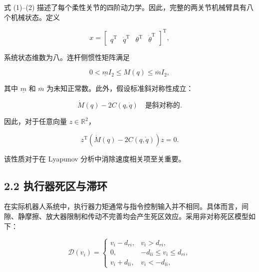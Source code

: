 \documentclass{article}
\begin{document}
式 (1)–(2) 描述了每个柔性关节的四阶动力学。因此，完整的两关节机械臂具有八个机械状态。定义

\begin{equation*}
x=\begin{bmatrix}q^{\mathrm T} & \dot q^{\mathrm T} & \theta^{\mathrm T} & \dot\theta^{\mathrm T}\end{bmatrix}^{\mathrm T},
\end{equation*}

系统状态维数为八。连杆侧惯性矩阵满足

\begin{equation}
0<\underline m I_2\leq M(q)\leq \overline m I_2, \tag{4}
\end{equation}

其中 $\underline m$ 和 $\overline m$ 为未知正常数。此外，假设标准斜对称性成立：

\begin{equation}
\dot M(q)-2C(q,\dot q) \quad \text{是斜对称的}. \tag{5}
\end{equation}

因此，对于任意向量 $z\in\mathbb{R}^{2}$，

\begin{equation*}
z^{\mathrm T}\left(\dot M(q)-2C(q,\dot q)\right)z=0.
\end{equation*}

该性质对于在 Lyapunov 分析中消除速度相关项至关重要。

\begin{figure}[h]
\centering
{}
\end{figure}

\subsection{2.2 执行器死区与滞环}

在实际机器人系统中，执行器力矩通常与指令控制输入并不相同。具体而言，间隙、静摩擦、放大器限制和传动不完善均会产生死区效应。采用非对称死区模型如下：

\begin{equation}
\mathcal{D}(v_i)=\begin{cases}v_i-d_{ri}, & v_i>d_{ri},\\[2mm]0, & -d_{li}\leq v_i\leq d_{ri},\\[2mm]v_i+d_{li}, & v_i<-d_{li},\end{cases} \tag{6}
\end{equation}
\end{document}
